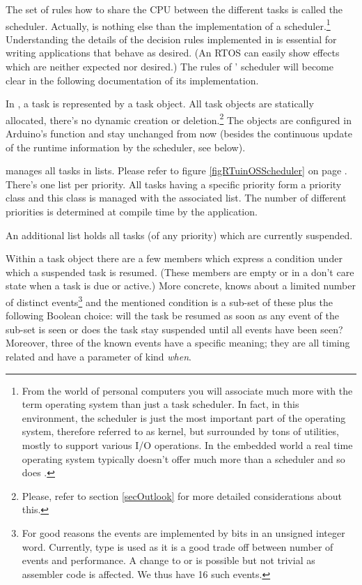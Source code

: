 The set of rules how to share the CPU between the different tasks is
called the scheduler. Actually, \rtos{} is nothing else than the
implementation of a scheduler.\footnote{From the world of personal
computers you will associate much more with the term operating system than
just a task scheduler. In fact, in this environment, the scheduler is just
the most important part of the operating system, therefore referred to as
kernel, but surrounded by tons of utilities, mostly to support various I/O
operations. In the embedded world a real time operating system typically
doesn't offer much more than a scheduler and so does \rtos{}.}
Understanding the details of the decision rules implemented in \rtos{} is
essential for writing applications that behave as desired. (An RTOS can
easily show effects which are neither expected nor desired.) The rules of
\rtos' scheduler will become clear in the following documentation of its
implementation.

In \rtos{}, a task is represented by a task object. All task objects are
statically allocated, there's no dynamic creation or
deletion.\footnote{Please, refer to section \ref{secOutlook} for more
detailed considerations about this.} The objects are configured in
Arduino's function  and stay unchanged from now (besides the
continuous update of the runtime information by the scheduler, see below).

\rtos{} manages all tasks in lists. Please refer to figure \ref{figRTuinOSScheduler} on page
\pageref{figRTuinOSScheduler}. There's one list per priority. All
tasks having a specific priority form a priority class and this class is
managed with the associated list. The number of different priorities is
determined at compile time by the application.

An additional list holds all tasks (of any priority) which are currently
suspended.

Within a task object there are a few members which express a condition
under which a suspended task is resumed. (These members are empty or in a
don't care state when a task is due or active.) More concrete, \rtos{}
knows about a limited number of distinct events\footnote{For good reasons
the events are implemented by bits in an unsigned integer word. Currently,
type  is used as it is a good trade off between number
of events and performance. A change to  or
 is possible but not trivial as assembler code is
affected. We thus have 16 such events.} and the mentioned condition is a
sub-set of these plus the following Boolean choice: will the task be
resumed as soon as any event of the sub-set is seen or does the task stay
suspended until all events have been seen? Moreover, three of the known
events have a specific meaning; they are all timing related and have a
parameter of kind \emph{when}.

